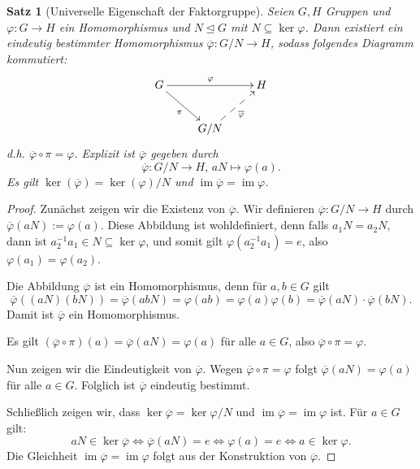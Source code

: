 \documentclass[a4paper, twoside, 11pt, ngerman]{report}
\DeclareMathOperator{\image}{im}
\theoremstyle{definistyle}
\newtheorem{satz}{Satz}[section]
\theoremstyle{remark}
\begin{document}
\begin{satz}[Universelle Eigenschaft der Faktorgruppe]\label{satz:universelle_eigenschaft_faktorgruppe}
Seien $G, H$ Gruppen und $\varphi \colon G \to H$ ein Homomorphismus und $N \trianglelefteq G$ mit $N \subseteq \ker \varphi$. Dann existiert ein eindeutig bestimmter Homomorphismus $\overline{\varphi} \colon G/N \to H$, sodass folgendes Diagramm kommutiert:
\[
\xymatrix{
    G \ar[rr]^{\varphi} \ar[dr]_{\pi} & & H \\
    & G/N \ar@{-->}[ur]_{\overline{\varphi}}
}
\]
d.h. $\overline{\varphi} \circ \pi = \varphi$. Explizit ist $\overline{\varphi}$ gegeben durch 
\[
\overline{\varphi} \colon G/N \to H, \, aN \mapsto \varphi(a).
\]
Es gilt $\ker(\overline{\varphi}) = \ker(\varphi)/N$ und $\image \overline{\varphi} = \image \varphi$.
\end{satz}

\begin{proof}
Zunächst zeigen wir die Existenz von $\overline{\varphi}$. Wir definieren $\overline{\varphi} \colon G / N \to H$ durch $\overline{\varphi}(aN) := \varphi(a)$. Diese Abbildung ist wohldefiniert, denn falls $a_1 N = a_2 N$, dann ist $a_2^{-1} a_1 \in N \subseteq \ker \varphi$, und somit gilt $\varphi(a_2^{-1} a_1) = e$, also $\varphi(a_1) = \varphi(a_2)$. 

Die Abbildung $\overline{\varphi}$ ist ein Homomorphismus, denn für $a, b \in G$ gilt
\[
\overline{\varphi}((aN)(bN)) = \overline{\varphi}(abN) = \varphi(ab) = \varphi(a) \varphi(b) = \overline{\varphi}(aN) \cdot \overline{\varphi}(bN).
\]
Damit ist $\overline{\varphi}$ ein Homomorphismus.

Es gilt $(\overline{\varphi} \circ \pi)(a) = \overline{\varphi}(aN) = \varphi(a)$ für alle $a \in G$, also $\overline{\varphi} \circ \pi = \varphi$.

Nun zeigen wir die Eindeutigkeit von $\overline{\varphi}$.  Wegen $\overline{\varphi}\circ\pi=\varphi$ folgt $\overline{\varphi}(aN)=\varphi(a)$ für alle $a\in G$.
Folglich ist $\overline{\varphi}$ eindeutig bestimmt.

Schließlich zeigen wir, dass $\ker \overline{\varphi} = \ker \varphi / N$ und $\image \overline{\varphi} = \image \varphi$ ist. Für $a\in G$ gilt:
\[aN \in \ker \overline{\varphi} \iff \overline{\varphi}(aN) = e \iff \varphi(a) = e \iff a \in \ker \varphi.\]
Die Gleichheit $\image \overline{\varphi} = \image \varphi$ folgt aus der Konstruktion von $\overline{\varphi}$.
\end{proof}
\end{document}
